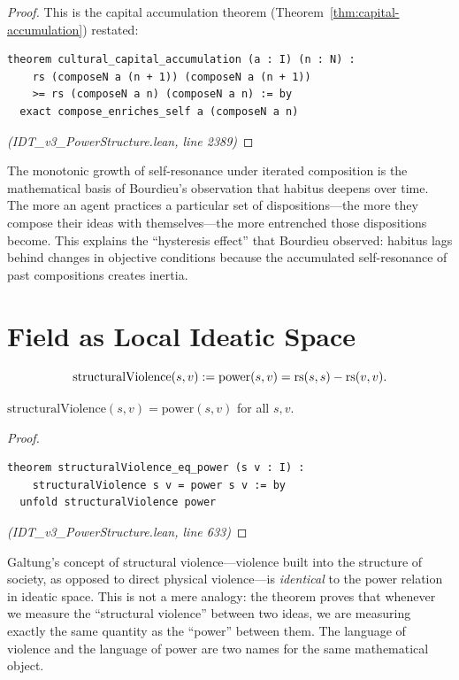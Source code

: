 \begin{proof}
This is the capital accumulation theorem (Theorem~\ref{thm:capital-accumulation})
restated:
\begin{lstlisting}
theorem cultural_capital_accumulation (a : I) (n : N) :
    rs (composeN a (n + 1)) (composeN a (n + 1))
    >= rs (composeN a n) (composeN a n) := by
  exact compose_enriches_self a (composeN a n)
\end{lstlisting}
\textit{(IDT\_v3\_PowerStructure.lean, line 2389)}
\end{proof}

\begin{interpretation}
The monotonic growth of self-resonance under iterated composition is the
mathematical basis of Bourdieu's observation that habitus deepens over time.
The more an agent practices a particular set of dispositions---the more
they compose their ideas with themselves---the more entrenched those dispositions
become. This explains the ``hysteresis effect'' that Bourdieu observed: habitus
lags behind changes in objective conditions because the accumulated
self-resonance of past compositions creates inertia.
\end{interpretation}

\section{Field as Local Ideatic Space}

\begin{definition}
\label{def:structural-violence}
\[
  \mathrm{structuralViolence}(s, v) := \mathrm{power}(s, v) = \mathrm{rs}(s,s) - \mathrm{rs}(v,v).
\]
\end{definition}

\begin{theorem}
\label{thm:structural-violence-power}
$\mathrm{structuralViolence}(s, v) = \mathrm{power}(s, v)$ for all $s, v$.
\end{theorem}

\begin{proof}
\begin{lstlisting}
theorem structuralViolence_eq_power (s v : I) :
    structuralViolence s v = power s v := by
  unfold structuralViolence power
\end{lstlisting}
\textit{(IDT\_v3\_PowerStructure.lean, line 633)}
\end{proof}

\begin{interpretation}
Galtung's concept of structural violence---violence built into the structure of
society, as opposed to direct physical violence---is \emph{identical} to the
power relation in ideatic space. This is not a mere analogy: the theorem proves
that whenever we measure the ``structural violence'' between two ideas, we are
measuring exactly the same quantity as the ``power'' between them. The language
of violence and the language of power are two names for the same mathematical
object.
\end{interpretation}

